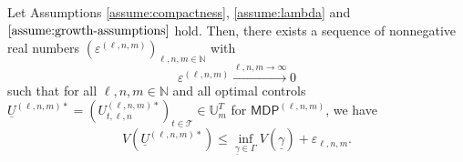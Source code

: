\documentclass[11pt]{article}
\newcommand{\NN}{\mathbb{N}}
\newcommand{\UU}{\mathbb{U}}
\newcommand{\cT}{\mathcal{T}}
\begin{document}
\begin{theorem}\label{thm:triply-quantized-efficiency}
    Let Assumptions \ref{assume:compactness}, \ref{assume:lambda} and $\ref{assume:growth-assumptions}$ hold. Then, there exists a sequence of nonnegative real numbers $(\varepsilon^{(\ell,n,m)})_{\ell,n,m\in\NN}$ with
    \begin{equation*}
     \varepsilon^{(\ell,n,m)}\xrightarrow{\ell,n,m\to\infty}0
    \end{equation*} 
    such that for all $\ell,n,m\in\NN$ and all optimal controls $\underline{U}^{(\ell,n,m)*} = (U_{t,\ell,n}^{(\ell,n,m)*})_{t\in\cT} \in \UU_m^T$ for $\mathsf{MDP}^{(\ell,n,m)}$, we have
    \begin{equation*}
        V(\underline{U}^{(\ell,n,m)*}) \leq \inf_{\underline{\gamma}\in\Gamma}V(\underline{\gamma}) + \varepsilon_{\ell,n,m}.
    \end{equation*}
\end{theorem}
\end{document}
